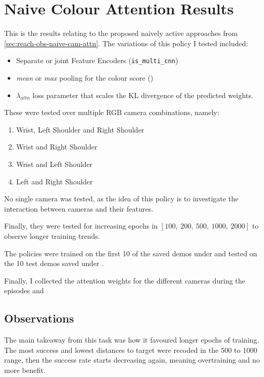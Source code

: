 \section{Naive Colour Attention Results}
This is the results relating to the proposed naively active approaches from \ref{sec:reach-obs-naive-cam-attn}.
The variations of this policy I tested included: 
\begin{itemize}
  \item Separate or joint Feature Encoders (\verb|is_multi_cnn|)
  \item \emph{mean} or \emph{max} pooling for the colour score (\verb||)
  \item $\lambda_{attn}$ loss parameter that scales the KL divergence of the predicted 
  weights.
\end{itemize}
These were tested over multiple RGB camera combinations, namely:
\begin{enumerate}
  \item Wrist, Left Shoulder and Right Shoulder
  \item Wrist and Right Shoulder
  \item Wrist and Left Shoulder
  \item Left and Right Shoulder
\end{enumerate}
No single camera was tested, as the idea of this policy is to investigate the interaction between cameras and their features.

Finally, they were tested for increasing epochs in \(\left[100, ~200, ~500, ~1000, ~2000\right]\) to observe longer training trends.

The policies were trained on the first 10 of the saved demos under  and tested on the 10 test demos saved under .

Finally, I collected the attention weights for the different cameras during the episodes and 

\subsection{Observations}
The main takeaway from this task was how it favoured longer epochs of training. The most success and lowest distances to target were recoded in the $500$ to $1000$ range, then the success rate starts decreasing again, meaning overtraining and no more benefit.\todo[color=purple]{}

